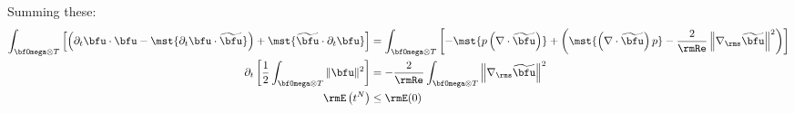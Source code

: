    Summing these:
    \begin{align}
        \int_{\bfOmega\otimes T}\left[\left(\partial_{t}\bfu\cdot\bfu - \mst{\partial_{t}\bfu\cdot\widetilde{\bfu}}\right) + \mst{\widetilde{\bfu}\cdot\partial_{t}\bfu}\right]  &=  \int_{\bfOmega\otimes T}\left[- \mst{p\left(\nabla\cdot\widetilde{\bfu}\right)} + \left(\mst{\left(\nabla\cdot\widetilde{\bfu}\right)p} - \frac{2}{\rmRe}\left\|\nabla_{\rms}\widetilde{\bfu}\right\|^{2}\right)\right]  \\
        \partial_{t}\left[\frac{1}{2}\int_{\bfOmega\otimes T}\|\bfu\|^{2}\right]  &=  - \frac{2}{\rmRe}\int_{\bfOmega\otimes T}\left\|\nabla_{\rms}\widetilde{\bfu}\right\|^{2}  \label{eqn:weak NS dissipation}  \\
        \rmE\left(t^{N}\right)  &\leq  \rmE(0)
    \end{align}

